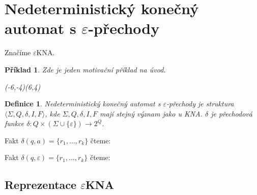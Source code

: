 \documentclass[10pt, a4paper, titlepage]{article}
\theoremstyle{note}
\newtheorem{definice}{Definice}
\newtheorem{priklad}{Příklad}
\newcommand{\ekna}{$\varepsilon$KNA}		%
\begin{document}
\section{Nedeterministický konečný automat s $\varepsilon$-přechody}
Značíme \ekna.
\begin{priklad}\label{priklad-5}
Zde je jeden motivační příklad na úvod.

\begin{center}
\begin{VCPicture}{(-6,-4)(6,4)}
\end{VCPicture}
\end{center}

\end{priklad}

\begin{definice}
Nedeterministický konečný automat s $\varepsilon$-přechody je struktura $ \langle \Sigma,Q,\delta,I,F \rangle $,
kde $\Sigma,Q,\delta,I,F$ mají stejný význam jako u KNA. $\delta$ je přechodová funkce $\delta : Q \times (\Sigma \cup \lbrace \varepsilon \rbrace ) \rightarrow 2^Q$.
\end{definice}

Fakt $\delta (q,a) = \lbrace r_1,\ldots,r_k \rbrace $ čteme: 

Fakt $\delta (q,\varepsilon) = \lbrace r_1,\ldots,r_k \rbrace $ čteme: 

\subsection{Reprezentace \ekna}
\end{document}
